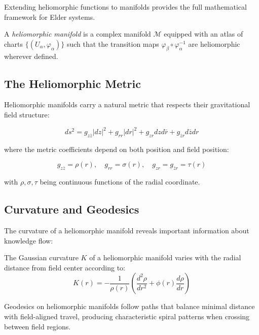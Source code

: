 Extending heliomorphic functions to manifolds provides the full mathematical framework for Elder systems.

\begin{definition}
A \textit{heliomorphic manifold} is a complex manifold $\mathcal{M}$ equipped with an atlas of charts $\{(U_{\alpha}, \varphi_{\alpha})\}$ such that the transition maps $\varphi_{\beta} \circ \varphi_{\alpha}^{-1}$ are heliomorphic wherever defined.
\end{definition}

\subsection{The Heliomorphic Metric}

Heliomorphic manifolds carry a natural metric that respects their gravitational field structure:

\begin{equation}
ds^2 = g_{z\bar{z}}|dz|^2 + g_{rr}|dr|^2 + g_{z r}dz d\bar{r} + g_{\bar{z}r}d\bar{z}dr
\end{equation}

where the metric coefficients depend on both position and field position:

\begin{equation}
g_{z\bar{z}} = \rho(r), \quad g_{rr} = \sigma(r), \quad g_{z r} = g_{\bar{z}r} = \tau(r)
\end{equation}

with $\rho, \sigma, \tau$ being continuous functions of the radial coordinate.

\subsection{Curvature and Geodesics}

The curvature of a heliomorphic manifold reveals important information about knowledge flow:

\begin{proposition}
The Gaussian curvature $K$ of a heliomorphic manifold varies with the radial distance from field center according to:
\begin{equation}
K(r) = -\frac{1}{\rho(r)}\left(\frac{d^2\rho}{dr^2} + \phi(r)\frac{d\rho}{dr}\right)
\end{equation}
\end{proposition}

Geodesics on heliomorphic manifolds follow paths that balance minimal distance with field-aligned travel, producing characteristic spiral patterns when crossing between field regions.

